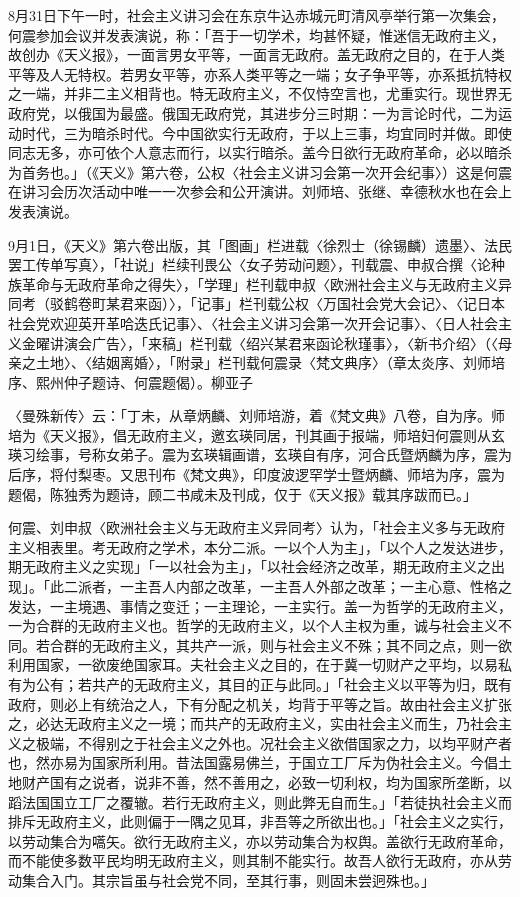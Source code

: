 8月31日下午一时，社会主义讲习会在东京牛込赤城元町清风亭举行第一次集会，何震参加会议并发表演说，称：「吾于一切学术，均甚怀疑，惟迷信无政府主义，故创办《天义报》，一面言男女平等，一面言无政府。盖无政府之目的，在于人类平等及人无特权。若男女平等，亦系人类平等之一端；女子争平等，亦系抵抗特权之一端，并非二主义相背也。特无政府主义，不仅恃空言也，尤重实行。现世界无政府党，以俄国为最盛。俄国无政府党，其进步分三时期：一为言论时代，二为运动时代，三为暗杀时代。今中国欲实行无政府，于以上三事，均宜同时并做。即使同志无多，亦可依个人意志而行，以实行暗杀。盖今日欲行无政府革命，必以暗杀为首务也。」（《天义》第六卷，公权〈社会主义讲习会第一次开会纪事〉）这是何震在讲习会历次活动中唯一一次参会和公开演讲。刘师培、张继、幸德秋水也在会上发表演说。

9月1日，《天义》第六卷出版，其「图画」栏进载〈徐烈士（徐锡麟）遗墨〉、法民罢工传单写真〉，「社说」栏续刊畏公〈女子劳动问题〉，刊载震、申叔合撰〈论种族革命与无政府革命之得失〉，「学理」栏刊载申叔〈欧洲社会主义与无政府主义异同考（驳鹤卷町某君来函）〉，「记事」栏刊载公权〈万国社会党大会记〉、〈记日本社会党欢迎英开革哈迭氏记事〉、〈社会主义讲习会第一次开会记事〉、〈日人社会主义金曜讲演会广告〉，「来稿」栏刊载〈绍兴某君来函论秋瑾事〉，〈新书介绍〉（〈母亲之土地〉、〈结姻离婚〉，「附录」栏刊载何震录〈梵文典序〉（章太炎序、刘师培序、熙州仲子题诗、何震题偈）。柳亚子


\noindent 〈曼殊新传〉云：「丁未，从章炳麟、刘师培游，着《梵文典》八卷，自为序。师培为《天义报》，倡无政府主义，邀玄瑛同居，刊其画于报端，师培妇何震则从玄瑛习绘事，号称女弟子。震为玄瑛辑画谱，玄瑛自有序，河合氏暨炳麟为序，震为后序，将付梨枣。又思刊布《梵文典》，印度波逻罕学士暨炳麟、师培为序，震为题偈，陈独秀为题诗，顾二书咸未及刊成，仅于《天义报》载其序跋而已。」

何震、刘申叔〈欧洲社会主义与无政府主义异同考〉认为，「社会主义多与无政府主义相表里。考无政府之学术，本分二派。一以个人为主」，「以个人之发达进步，期无政府主义之实现」「一以社会为主」，「以社会经济之改革，期无政府主义之出现」。「此二派者，一主吾人内部之改革，一主吾人外部之改革；一主心意、性格之发达，一主境遇、事情之变迁；一主理论，一主实行。盖一为哲学的无政府主义，一为合群的无政府主义也。哲学的无政府主义，以个人主权为重，诚与社会主义不同。若合群的无政府主义，其共产一派，则与社会主义不殊；其不同之点，则一欲利用国家，一欲废绝国家耳。夫社会主义之目的，在于冀一切财产之平均，以易私有为公有；若共产的无政府主义，其目的正与此同。」「社会主义以平等为归，既有政府，则必上有统治之人，下有分配之机关，均背于平等之旨。故由社会主义扩张之，必达无政府主义之一境；而共产的无政府主义，实由社会主义而生，乃社会主义之极端，不得别之于社会主义之外也。况社会主义欲借国家之力，以均平财产者也，然亦易为国家所利用。昔法国露易佛兰，于国立工厂斥为伪社会主义。今倡土地财产国有之说者，说非不善，然不善用之，必致一切利权，均为国家所垄断，以蹈法国国立工厂之覆辙。若行无政府主义，则此弊无自而生。」「若徒执社会主义而排斥无政府主义，此则偏于一隅之见耳，非吾等之所欲出也。」「社会主义之实行，以劳动集合为嚆矢。欲行无政府主义，亦以劳动集合为权舆。盖欲行无政府革命，而不能使多数平民均明无政府主义，则其制不能实行。故吾人欲行无政府，亦从劳动集合入门。其宗旨虽与社会党不同，至其行事，则固未尝迥殊也。」

